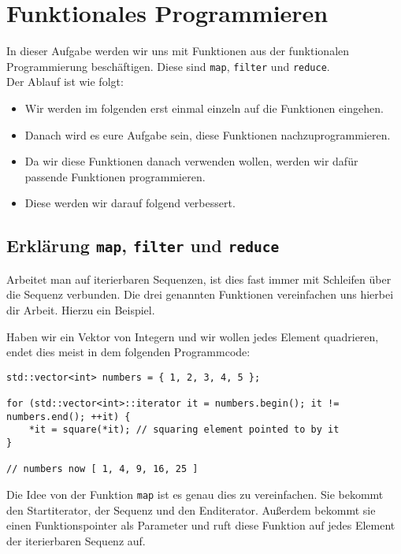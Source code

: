 \section{Funktionales Programmieren}

In dieser Aufgabe werden wir uns mit Funktionen aus der funktionalen Programmierung beschäftigen.
Diese sind \lstinline{map}, \lstinline{filter} und \lstinline{reduce}. \\

Der Ablauf ist wie folgt:
\begin{itemize}
    \item Wir werden im folgenden erst einmal einzeln auf die Funktionen eingehen.
    \item Danach wird es eure Aufgabe sein, diese Funktionen nachzuprogrammieren.
    \item Da wir diese Funktionen danach verwenden wollen, werden wir dafür passende Funktionen programmieren.
    \item Diese werden wir darauf folgend verbessert.
\end{itemize}

\subsection{Erklärung \lstinline{map}, \lstinline{filter} und \lstinline{reduce}}

Arbeitet man auf iterierbaren Sequenzen, ist dies fast immer mit Schleifen über die Sequenz verbunden.
Die drei genannten Funktionen vereinfachen uns hierbei dir Arbeit.
Hierzu ein Beispiel.

Haben wir ein Vektor von Integern und wir wollen jedes Element quadrieren, endet dies meist in dem folgenden Programmcode:

\begin{lstlisting}
std::vector<int> numbers = { 1, 2, 3, 4, 5 };

for (std::vector<int>::iterator it = numbers.begin(); it != numbers.end(); ++it) {
    *it = square(*it); // squaring element pointed to by it
}

// numbers now [ 1, 4, 9, 16, 25 ]
\end{lstlisting}

Die Idee von der Funktion \lstinline{map} ist es genau dies zu vereinfachen.
Sie bekommt den Startiterator, der Sequenz und den Enditerator.
Außerdem bekommt sie einen Funktionspointer als Parameter und ruft diese Funktion auf jedes Element der iterierbaren Sequenz auf.

